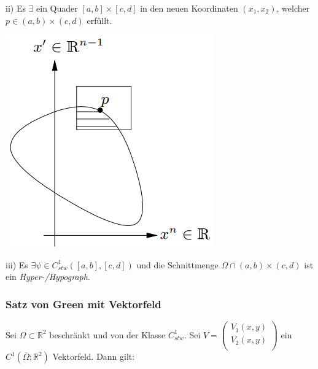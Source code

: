 \documentclass[a4paper, fontsize = 8pt, landscape]{scrartcl}
\newcommand{\R}[0]{\mathbb{R}}
\begin{document}
\begin{multicols*}{3}
\begin{center}
\begin{minipage}{0.74\linewidth}
            ii) Es $\exists$ ein Quader $[a,b] \times [c,d]$ in den neuen Koordinaten $(x_1, x_2)$, welcher $p \in (a,b) \times (c,d)$ erfüllt.
        \end{minipage}
        \begin{minipage}{0.25\linewidth}
            \begin{center}
                \includegraphics[width=1\linewidth]{Bilder/Stueckweise_Gebit.png}
            \end{center}
        \end{minipage}
    \end{center}

    iii) Es $\exists \psi \in C^1_{stw}([a,b],[c,d])$ und die Schnittmenge $\Omega \cap (a,b)\times(c,d)$ ist ein \emph{Hyper-/Hypograph}.

    \subsubsection{Satz von Green mit Vektorfeld}

    Sei $\Omega \subset \R^2$ beschränkt und von der Klasse $C^1_{stw}$. Sei $V = \begin{pmatrix}
            V_1(x,y) \\ V_2(x,y) \\
        \end{pmatrix}$ ein $C^1(\overline{\Omega};\R^2)$ Vektorfeld. Dann gilt:



\end{multicols*}
\end{document}
